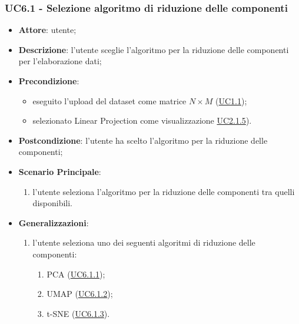     \subsubsection{UC6.1 - Selezione algoritmo di riduzione delle componenti}
    \label{uc6.1}
    
    \begin{itemize}
    \item \textbf{Attore}: utente;
    \item \textbf{Descrizione}: l'utente sceglie l'algoritmo per la riduzione delle componenti per l'elaborazione dati;
    \item \textbf{Precondizione}: 
    \begin{itemize}
        \item eseguito l'upload del dataset come matrice $N\times M$ (\hyperref[uc1.1]{UC1.1});
        \item selezionato Linear Projection come visualizzazione \hyperref[uc2.1.5]{UC2.1.5}).
    \end{itemize}  
    \item \textbf{Postcondizione}: l'utente ha scelto l'algoritmo per la riduzione delle componenti;
    \item \textbf{Scenario Principale}: 
    \begin{enumerate}
        \item l'utente seleziona l'algoritmo per la riduzione delle componenti tra quelli disponibili.
    \end{enumerate}
    \item \textbf{Generalizzazioni}:
        \begin{enumerate}
            \item l'utente seleziona uno dei seguenti algoritmi di riduzione delle componenti:
                \begin{enumerate}
                    \item PCA (\hyperref[uc6.1.1]{UC6.1.1});
                    \item UMAP (\hyperref[uc6.1.2]{UC6.1.2});
                    \item t-SNE (\hyperref[uc6.1.3]{UC6.1.3}).
                \end{enumerate}
        \end{enumerate}  
    \end{itemize}
    
